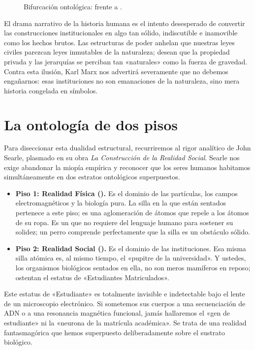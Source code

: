 \begin{figure}[htbp]
    \centering
    
    \caption{Bifurcación ontológica: \HechosBrutos{} frente a \HechosInstitucionales.}
    \label{fig:hechos_brutos}
\end{figure}

El drama narrativo de la historia humana es el intento desesperado de convertir las construcciones institucionales en algo tan sólido, indiscutible e inamovible como los hechos brutos. Las estructuras de poder anhelan que nuestras leyes civiles parezcan leyes inmutables de la naturaleza; desean que la propiedad privada y las jerarquías se perciban tan «naturales» como la fuerza de gravedad. Contra esta ilusión, Karl Marx nos advertirá severamente que no debemos engañarnos: esas instituciones no son emanaciones de la naturaleza, sino mera historia congelada en símbolos.

\section{La ontología de dos pisos}

Para diseccionar esta dualidad estructural, recurriremos al rigor analítico de John Searle, plasmado en su obra \textit{La Construcción de la Realidad Social}. Searle nos exige abandonar la miopía empírica y reconocer que los seres humanos habitamos simultáneamente en dos estratos ontológicos superpuestos.

\begin{itemize}
    \item \textbf{Piso 1: Realidad Física (\HechosBrutos).} Es el dominio de las partículas, los campos electromagnéticos y la biología pura. La silla en la que están sentados pertenece a este piso; es una aglomeración de átomos que repele a los átomos de su ropa. Es un \HechoBruto{} que no requiere del lenguaje humano para sostener su solidez; un perro comprende perfectamente que la silla es un obstáculo sólido.
    \item \textbf{Piso 2: Realidad Social (\FuncionEstatus).} Es el dominio de las instituciones. Esa misma silla atómica es, al mismo tiempo, el «pupitre de la universidad». Y ustedes, los organismos biológicos sentados en ella, no son meros mamíferos en reposo; ostentan el estatus de «Estudiantes Matriculados».
\end{itemize}

Este estatus de «Estudiante» es totalmente invisible e indetectable bajo el lente de un microscopio electrónico. Si sometemos sus cuerpos a una secuenciación de ADN o a una resonancia magnética funcional, jamás hallaremos el «gen de estudiante» ni la «neurona de la matrícula académica». Se trata de una realidad fantasmagórica que hemos superpuesto deliberadamente sobre el sustrato biológico.

